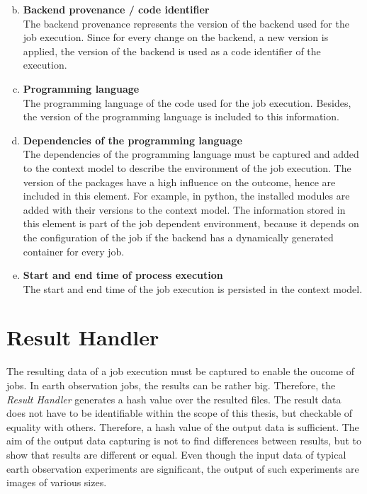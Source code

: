\documentclass[draft,final]{vutinfth} %
\begin{document}
\begin{enumerate}[(a)]
	\setcounter{enumi}{1}
	\item \textbf{Backend provenance / code identifier} \\
	The backend provenance represents the version of the backend used for the job execution. Since for every change on the backend, a new version is applied, the version of the backend is used as a code identifier of the execution.
	\item \textbf{Programming language}\\
	The programming language of the code used for the job execution. Besides, the version of the programming language is included to this information.
	\item \textbf{Dependencies of the programming language}\\
	The dependencies of the programming language must be captured and added to the context model to describe the environment of the job execution. The version of the packages have a high influence on the outcome, hence are included in this element. For example, in python, the installed modules are added with their versions to the context model. The information stored in this element is part of the job dependent environment, because it depends on the configuration of the job if the backend has a dynamically generated container for every job.
	\item \textbf{Start and end time of process execution}\\
	The start and end time of the job execution is persisted in the context model.
\end{enumerate}

\section{Result Handler}\label{Design:Result Handler}
The resulting data of a job execution must be captured to enable the oucome of jobs. In earth observation jobs, the results can be rather big. Therefore, the \textit{Result Handler} generates a hash value over the resulted files. The result data does not have to be identifiable within the scope of this thesis, but checkable of equality with others. Therefore, a hash value of the output data is sufficient. The aim of the output data capturing is not to find differences between results, but to show that results are different or equal. Even though the input data of typical earth observation experiments are significant, the output of such experiments are images of various sizes.
\end{document}
